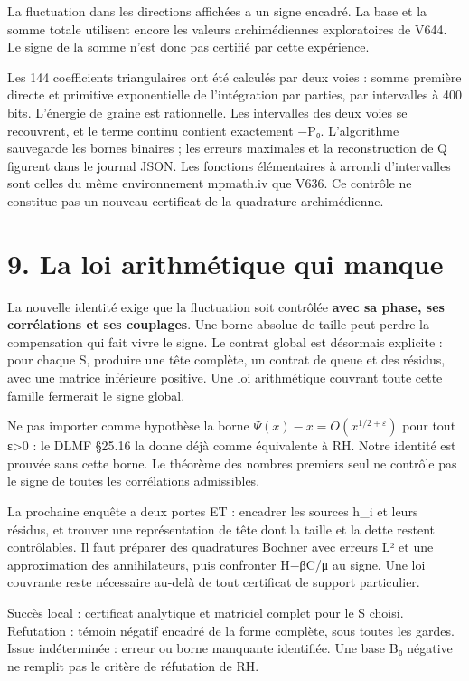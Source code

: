 \documentclass[
  10pt,
  a4paper,
]{article}
\begin{document}
La fluctuation dans les directions affichées a un signe encadré. La base
et la somme totale utilisent encore les valeurs archimédiennes
exploratoires de V644. Le signe de la somme n'est donc pas certifié par
cette expérience.

Les 144 coefficients triangulaires ont été calculés par deux voies :
somme première directe et primitive exponentielle de l'intégration par
parties, par intervalles à 400 bits. L'énergie de graine est
rationnelle. Les intervalles des deux voies se recouvrent, et le terme
continu contient exactement −P₀. L'algorithme sauvegarde les bornes
binaires ; les erreurs maximales et la reconstruction de Q figurent dans
le journal JSON. Les fonctions élémentaires à arrondi d'intervalles sont
celles du même environnement mpmath.iv que V636. Ce contrôle ne
constitue pas un nouveau certificat de la quadrature archimédienne.

\hypertarget{la-loi-arithmuxe9tique-qui-manque}{%
\section{9. La loi arithmétique qui
manque}\label{la-loi-arithmuxe9tique-qui-manque}}

La nouvelle identité exige que la fluctuation soit contrôlée
\textbf{avec sa phase, ses corrélations et ses couplages}. Une borne
absolue de taille peut perdre la compensation qui fait vivre le signe.
Le contrat global est désormais explicite : pour chaque S, produire une
tête complète, un contrat de queue et des résidus, avec une matrice
inférieure positive. Une loi arithmétique couvrant toute cette famille
fermerait le signe global.

Ne pas importer comme hypothèse la borne
\(\Psi(x)-x=O(x^{1/2+\varepsilon})\) pour tout ε\textgreater0 : le DLMF
§25.16 la donne déjà comme équivalente à RH. Notre identité est prouvée
sans cette borne. Le théorème des nombres premiers seul ne contrôle pas
le signe de toutes les corrélations admissibles.

La prochaine enquête a deux portes ET : encadrer les sources h\_i et
leurs résidus, et trouver une représentation de tête dont la taille et
la dette restent contrôlables. Il faut préparer des quadratures Bochner
avec erreurs L² et une approximation des annihilateurs, puis confronter
H−βC/μ au signe. Une loi couvrante reste nécessaire au-delà de tout
certificat de support particulier.

Succès local : certificat analytique et matriciel complet pour le S
choisi. Refutation : témoin négatif encadré de la forme complète, sous
toutes les gardes. Issue indéterminée : erreur ou borne manquante
identifiée. Une base B₀ négative ne remplit pas le critère de réfutation
de RH.
\end{document}
